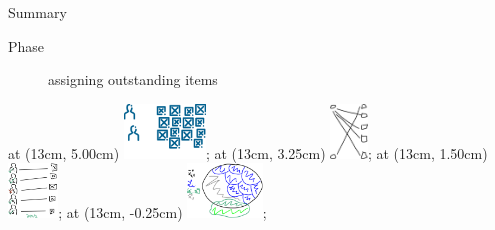 \begin{frame}{Summary}
\begin{itemize}
\begin{description}
			\item[Phase \phaseiii]
			assigning outstanding items
		\end{description}
	\end{itemize}
	\beamerimage at (13cm,  5.00cm) {\includegraphics[height=1.45cm]{img/nvsm}};
	\beamerimage at (13cm,  3.25cm) {\includegraphics[height=1.45cm]{img/allocation}};
	\beamerimage at (13cm,  1.50cm) {\includegraphics[height=1.45cm]{img/outstanding_1}};
	\beamerimage at (13cm, -0.25cm) {\includegraphics[height=1.45cm]{img/anal2_1}};
%
\end{frame}





